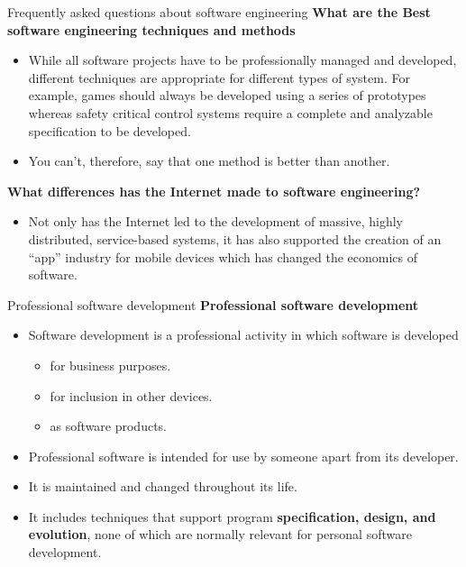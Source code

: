 \documentclass{beamer}
\begin{document}
\begin{frame}{Frequently 
		asked questions about 
		software engineering}
	\textbf{What are the Best software engineering 
		techniques and methods}
	\begin{itemize}
		\item While all software projects have to be 
		professionally managed and developed, 
		different techniques are appropriate for 
		different types of system. For example, 
		games should always be developed using 
		a series of prototypes whereas safety 
		critical control systems require a complete 
		and analyzable specification to be 
		developed. 
		\item You can’t, therefore, say that 
		one method is better than another.
	\end{itemize}

\textbf{What differences has the Internet 
	made to software engineering?}
\begin{itemize}
	\item Not only has the Internet led to the development of massive, highly 
	distributed, service-based systems, it has also supported the 
	creation of an “app” industry for mobile devices which has 
	changed the economics of software.
\end{itemize}
\end{frame}

\begin{frame}{Professional software development}
\textbf{Professional software development}
\begin{itemize}
	\item Software development is a professional activity in which software is developed 
	\begin{itemize}
		\item for business purposes.
		\item for inclusion in other devices.
		\item as software products.
	\end{itemize}
\item Professional software is intended for use by someone apart from its developer.
\item It is maintained and changed throughout its life.
\item It includes techniques that support program \textbf{specification, design, and evolution},    none of which are normally relevant for personal software development.
\end{itemize}
\end{frame}
\end{document}
